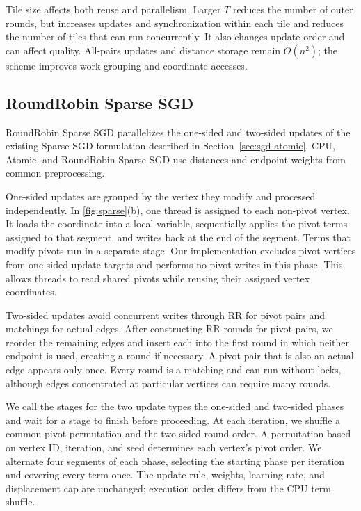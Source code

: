 Tile size affects both reuse and parallelism.
Larger $T$ reduces the number of outer rounds, but increases updates and synchronization within each tile and reduces the number of tiles that can run concurrently.
It also changes update order and can affect quality.
All-pairs updates and distance storage remain $O(n^2)$; the scheme improves work grouping and coordinate accesses.

\subsection{RoundRobin Sparse SGD}

RoundRobin Sparse SGD parallelizes the one-sided and two-sided updates of the existing Sparse SGD formulation described in Section~\ref{sec:sgd-atomic}.
CPU, Atomic, and RoundRobin Sparse SGD use distances and endpoint weights from common preprocessing.

One-sided updates are grouped by the vertex they modify and processed independently.
In \autoref{fig:sparse}(b), one thread is assigned to each non-pivot vertex.
It loads the coordinate into a local variable, sequentially applies the pivot terms assigned to that segment, and writes back at the end of the segment.
Terms that modify pivots run in a separate stage.
Our implementation excludes pivot vertices from one-sided update targets and performs no pivot writes in this phase.
This allows threads to read shared pivots while reusing their assigned vertex coordinates.

Two-sided updates avoid concurrent writes through RR for pivot pairs and matchings for actual edges.
After constructing RR rounds for pivot pairs, we reorder the remaining edges and insert each into the first round in which neither endpoint is used, creating a round if necessary.
A pivot pair that is also an actual edge appears only once.
Every round is a matching and can run without locks, although edges concentrated at particular vertices can require many rounds.

We call the stages for the two update types the one-sided and two-sided phases and wait for a stage to finish before proceeding.
At each iteration, we shuffle a common pivot permutation and the two-sided round order.
A permutation based on vertex ID, iteration, and seed determines each vertex's pivot order.
We alternate four segments of each phase, selecting the starting phase per iteration and covering every term once.
The update rule, weights, learning rate, and displacement cap are unchanged; execution order differs from the CPU term shuffle.
